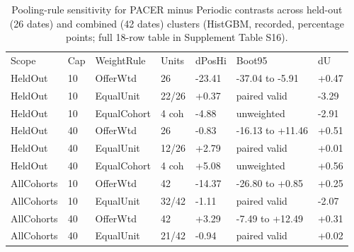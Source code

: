 \begin{table}[!ht]
\centering\footnotesize\setlength{\tabcolsep}{3.5pt}
\caption{Pooling-rule sensitivity for PACER minus Periodic contrasts across held-out (26 dates) and combined (42 dates) clusters (HistGBM, recorded, percentage points; full 18-row table in Supplement Table S16).}
\begin{tabular}{lllllll}
\hline
Scope & Cap & WeightRule & Units & dPosHi & Boot95 & dU \\
HeldOut & 10 & OfferWtd & 26 & -23.41 & -37.04 to -5.91 & +0.47 \\
HeldOut & 10 & EqualUnit & 22/26 & +0.37 & paired valid & -3.29 \\
HeldOut & 10 & EqualCohort & 4 coh & -4.88 & unweighted & -2.91 \\
HeldOut & 40 & OfferWtd & 26 & -0.83 & -16.13 to +11.46 & +0.51 \\
HeldOut & 40 & EqualUnit & 12/26 & +2.79 & paired valid & +0.01 \\
HeldOut & 40 & EqualCohort & 4 coh & +5.08 & unweighted & +0.56 \\
AllCohorts & 10 & OfferWtd & 42 & -14.37 & -26.80 to +0.85 & +0.25 \\
AllCohorts & 10 & EqualUnit & 32/42 & -1.11 & paired valid & -2.07 \\
AllCohorts & 40 & OfferWtd & 42 & +3.29 & -7.49 to +12.49 & +0.31 \\
AllCohorts & 40 & EqualUnit & 21/42 & -0.94 & paired valid & +0.02 \\
\hline
\end{tabular}
\end{table}
